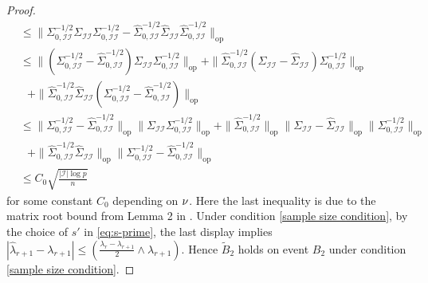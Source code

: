 \documentclass[11pt]{article}
\newcommand{\nb}[1]{\textcolor{orange}{\texttt{[#1]}}}
\newcommand{\gsc}[1]{\textcolor{blue}{\texttt{[#1]}}}
\newcommand{\rev}[1]{\textcolor{black}{#1}}
\newcommand{\cI}{{\mathcal{I}}}
\newcommand{\0}{{\mathbf{0}}}
\newcommand{\op}{{\mathrm{op}}}
\begin{document}
\begin{proof}
\begin{align*}
& \leq  \|\Sigma_{0,\cI\cI}^{-1/2}\Sigma_{\cI\cI}\Sigma_{0,\cI\cI}^{-1/2}-\widehat{\Sigma}_{0,\cI\cI}^{-1/2}\widehat{\Sigma}_{\cI\cI}\widehat{\Sigma}_{0,\cI\cI}^{-1/2}\|_\op\\
& \leq \|(\Sigma_{0,\cI\cI}^{-1/2}-\widehat{\Sigma}_{0,\cI\cI}^{-1/2})\Sigma_{\cI\cI}\Sigma_{0,\cI\cI}^{-1/2}\|_\op+\|\widehat{\Sigma}_{0,\cI\cI}^{-1/2}(\Sigma_{\cI\cI}-\widehat{\Sigma}_{\cI\cI})\Sigma_{0,\cI\cI}^{-1/2}\|_\op\\
&~~~ +\|\widehat{\Sigma}_{0,\cI\cI}^{-1/2}\widehat{\Sigma}_{\cI\cI}(\Sigma_{0,\cI\cI}^{-1/2}-\widehat{\Sigma}_{0,\cI\cI}^{-1/2})\|_\op\\
& \leq \|\Sigma_{0,\cI\cI}^{-1/2}-\widehat{\Sigma}_{0,\cI\cI}^{-1/2}\|_\op\|\Sigma_{\cI\cI}\Sigma_{0,\cI\cI}^{-1/2}\|_\op+\|\widehat{\Sigma}_{0,\cI\cI}^{-1/2}\|_\op\|\Sigma_{\cI\cI}-\widehat{\Sigma}_{\cI\cI}\|_\op\|\Sigma_{0,\cI\cI}^{-1/2}\|_\op\\
&~~~ +\|\widehat{\Sigma}_{0,\cI\cI}^{-1/2}\widehat{\Sigma}_{\cI\cI}\|_\op\|\Sigma_{0,\cI\cI}^{-1/2}-\widehat{\Sigma}_{0,\cI\cI}^{-1/2}\|_\op \\
& \leq  C_0\sqrt{\frac{|\cI|\log p}{n}}
\end{align*}
for some constant $C_0$ depending on $\rev{\nu}$.
Here the last inequality is due to the matrix root bound from Lemma 2 in \cite{gao2015minimax}.
Under condition \eqref{sample size condition}, by the choice of $s'$ in \eqref{eq:s-prime}, the last display implies $|\widehat{\lambda}_{r+1}-\lambda_{r+1}|\leq (\frac{\lambda_r-\lambda_{r+1}}{2}\wedge\lambda_{r+1})$.
Hence $\widetilde{B}_2$ holds on event $B_2$ under condition \eqref{sample size condition}. 


\end{proof}
\end{document}
